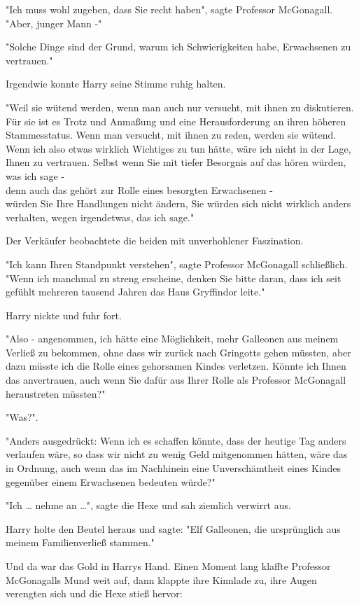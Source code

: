 {"Ich muss wohl zugeben, dass Sie recht haben", sagte Professor McGonagall. "Aber, junger Mann -"

"Solche Dinge sind der Grund, warum ich Schwierigkeiten habe, Erwachsenen zu vertrauen."

Irgendwie konnte Harry seine Stimme ruhig halten.

"Weil sie wütend werden, wenn man auch nur versucht, mit ihnen zu diskutieren. Für sie ist es Trotz und Anmaßung und eine Herausforderung an ihren höheren Stammesstatus. Wenn man versucht, mit ihnen zu reden, werden sie wütend. Wenn ich also etwas wirklich Wichtiges zu tun hätte, wäre ich nicht in der Lage, Ihnen zu vertrauen. Selbst wenn Sie mit tiefer Besorgnis auf das hören würden, was ich sage -\\ denn auch das gehört zur Rolle eines besorgten Erwachsenen -\\ würden Sie Ihre Handlungen nicht ändern, Sie würden sich nicht wirklich anders verhalten, wegen irgendetwas, das ich sage."

Der Verkäufer beobachtete die beiden mit unverhohlener Faszination.

"Ich kann Ihren Standpunkt verstehen", sagte Professor McGonagall schließlich. "Wenn ich manchmal zu streng erscheine, denken Sie bitte daran, dass ich seit gefühlt mehreren tausend Jahren das Haus Gryffindor leite."

Harry nickte und fuhr fort.

"Also - angenommen, ich hätte eine Möglichkeit, mehr Galleonen aus meinem Verließ zu bekommen, ohne dass wir zurück nach Gringotts gehen müssten, aber dazu müsste ich die Rolle eines gehorsamen Kindes verletzen. Könnte ich Ihnen das anvertrauen, auch wenn Sie dafür aus Ihrer Rolle als Professor McGonagall heraustreten müssten?"

"Was?".

"Anders ausgedrückt: Wenn ich es schaffen könnte, dass der heutige Tag anders verlaufen wäre, so dass wir nicht zu wenig Geld mitgenommen hätten, wäre das in Ordnung, auch wenn das im Nachhinein eine Unverschämtheit eines Kindes gegenüber einem Erwachsenen bedeuten würde?"

"Ich … nehme an …", sagte die Hexe und sah ziemlich verwirrt aus.

Harry holte den Beutel heraus und sagte: "Elf Galleonen, die ursprünglich aus meinem Familienverließ stammen."

Und da war das Gold in Harrys Hand. Einen Moment lang klaffte Professor McGonagalls Mund weit auf, dann klappte ihre Kinnlade zu, ihre Augen verengten sich und die Hexe stieß hervor:

}
